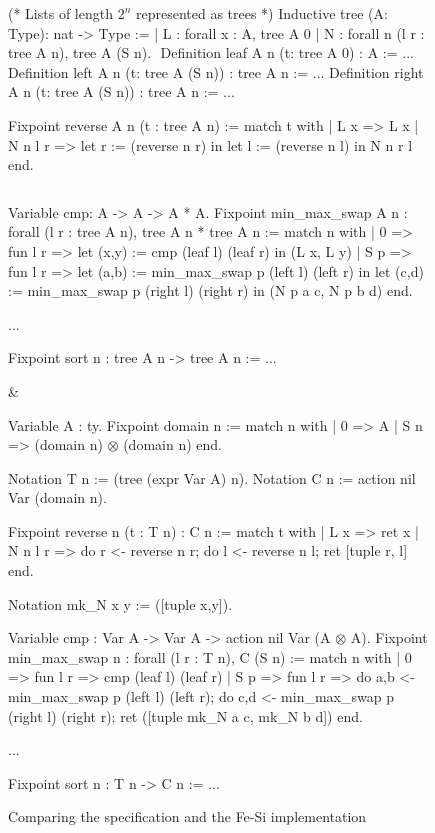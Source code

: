\documentclass{llncs}
\begin{document}
\begin{figure}[t]
  \centering
\begin{twolistings}
\begin{coq}
(* Lists of length $2^n$ represented as trees *)
Inductive tree (A: Type): nat -> Type :=
| L : forall x : A, tree A 0
| N : forall n (l r : tree A n), tree A (S n). 
$ $
Definition leaf  {A n} (t: tree A 0) : A := ...
Definition left  {A n} (t: tree A (S n)) : tree A n := ...
Definition right {A n} (t: tree A (S n)) : tree A n := ...

Fixpoint reverse {A} n (t : tree A n) :=
match t with 
| L x => L x
| N n l r => 
  let r := (reverse n r) in 
  let l := (reverse n l) in 
  N n r l
end.

$ $

Variable cmp: A -> A -> A * A.
Fixpoint min_max_swap {A} n : 
  forall (l r : tree A n), tree A n * tree A n :=
match n with 
| 0 => fun l r => 
  let (x,y) := cmp (leaf l) (leaf r) in (L x, L y)
| S p => fun l r => 
  let (a,b) := min_max_swap p (left l) (left r) in 
  let (c,d) := min_max_swap p (right l) (right r) in 
  (N p a c, N p b d)
end. 

...

Fixpoint sort n : tree A n -> tree A n := ...
\end{coq}
& $\quad$
\begin{coq}
Variable A : ty.        
Fixpoint domain n := match n with 
| 0 => A
| S n => (domain n) $\otimes$ (domain n)
end. 

Notation T n := (tree (expr Var A) n). 
Notation C n := action nil Var (domain n). 

Fixpoint reverse n (t : T n) : C n  :=
match t with 
| L x => ret x
| N n l r => 
  do r <- reverse n r;
  do l <- reverse n l;
  ret [tuple r, l]
end.

Notation mk_N x y := ([tuple x,y]).

Variable cmp : Var A -> Var A -> action nil Var (A $\otimes$ A).
Fixpoint min_max_swap n : 
  forall (l r : T n), C (S n) :=
match n  with 
| 0 => fun l r => 
  cmp (leaf l) (leaf r)
| S p => fun l r => 
  do a,b <- min_max_swap p (left l) (left r);
  do c,d <- min_max_swap p (right l) (right r); 
  ret ([tuple mk_N a c, mk_N b d])
end.

...

Fixpoint sort n : T n -> C n := ...
\end{coq}
\end{twolistings}
  
  \caption{Comparing the specification and the Fe-Si implementation}
  \label{fig:reverse}
\end{figure}
\end{document}
